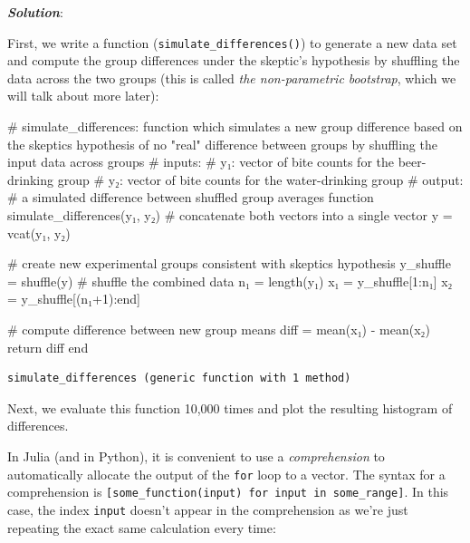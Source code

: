 \documentclass[
  letterpaper,
  DIV=11,
  numbers=noendperiod]{scrartcl}
\newenvironment{Shaded}{\begin{snugshade}}{\end{snugshade}}
\newcommand{\CommentTok}[1]{\textcolor[rgb]{0.37,0.37,0.37}{#1}}
\newcommand{\ControlFlowTok}[1]{\textcolor[rgb]{0.00,0.23,0.31}{#1}}
\newcommand{\FloatTok}[1]{\textcolor[rgb]{0.68,0.00,0.00}{#1}}
\newcommand{\FunctionTok}[1]{\textcolor[rgb]{0.28,0.35,0.67}{#1}}
\newcommand{\KeywordTok}[1]{\textcolor[rgb]{0.00,0.23,0.31}{#1}}
\newcommand{\NormalTok}[1]{\textcolor[rgb]{0.00,0.23,0.31}{#1}}
\newcommand{\OperatorTok}[1]{\textcolor[rgb]{0.37,0.37,0.37}{#1}}
\begin{document}
\textbf{\emph{Solution}}:

First, we write a function (\texttt{simulate\_differences()}) to
generate a new data set and compute the group differences under the
skeptic's hypothesis by shuffling the data across the two groups (this
is called \emph{the non-parametric bootstrap}, which we will talk about
more later):

\begin{Shaded}
\begin{Highlighting}[]
\CommentTok{\# simulate\_differences: function which simulates a new group difference based on the skeptic\textquotesingle{}s hypothesis of no "real" difference between groups by shuffling the input data across groups}
\CommentTok{\# inputs:}
\CommentTok{\#   y₁: vector of bite counts for the beer{-}drinking group}
\CommentTok{\#   y₂: vector of bite counts for the water{-}drinking group}
\CommentTok{\# output:}
\CommentTok{\#   a simulated difference between shuffled group averages}
\KeywordTok{function} \FunctionTok{simulate\_differences}\NormalTok{(y₁, y₂)}
    \CommentTok{\# concatenate both vectors into a single vector}
\NormalTok{    y }\OperatorTok{=} \FunctionTok{vcat}\NormalTok{(y₁, y₂)}

    \CommentTok{\# create new experimental groups consistent with skeptic\textquotesingle{}s hypothesis}
\NormalTok{    y\_shuffle }\OperatorTok{=} \FunctionTok{shuffle}\NormalTok{(y)   }\CommentTok{\# shuffle the combined data}
\NormalTok{    n₁ }\OperatorTok{=} \FunctionTok{length}\NormalTok{(y₁)}
\NormalTok{    x₁ }\OperatorTok{=}\NormalTok{ y\_shuffle[}\FloatTok{1}\OperatorTok{:}\NormalTok{n₁]}
\NormalTok{    x₂ }\OperatorTok{=}\NormalTok{ y\_shuffle[(n₁}\OperatorTok{+}\FloatTok{1}\NormalTok{)}\OperatorTok{:}\KeywordTok{end}\NormalTok{]}

    \CommentTok{\# compute difference between new group means}
\NormalTok{    diff }\OperatorTok{=} \FunctionTok{mean}\NormalTok{(x₁) }\OperatorTok{{-}} \FunctionTok{mean}\NormalTok{(x₂)}
    \ControlFlowTok{return}\NormalTok{ diff}
\KeywordTok{end}
\end{Highlighting}
\end{Shaded}

\begin{verbatim}
simulate_differences (generic function with 1 method)
\end{verbatim}

Next, we evaluate this function 10,000 times and plot the resulting
histogram of differences.

In Julia (and in Python), it is convenient to use a \emph{comprehension}
to automatically allocate the output of the \texttt{for} loop to a
vector. The syntax for a comprehension is
\texttt{{[}some\_function(input)\ for\ input\ in\ some\_range{]}}. In
this case, the index \texttt{input} doesn't appear in the comprehension
as we're just repeating the exact same calculation every time:
\end{document}

